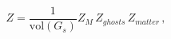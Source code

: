 \begin{equation}
Z = \frac{1}{\mathrm{vol}(G_s)} Z_{M}\, Z_{ghosts}\, Z_{matter}\,,
\end{equation}

